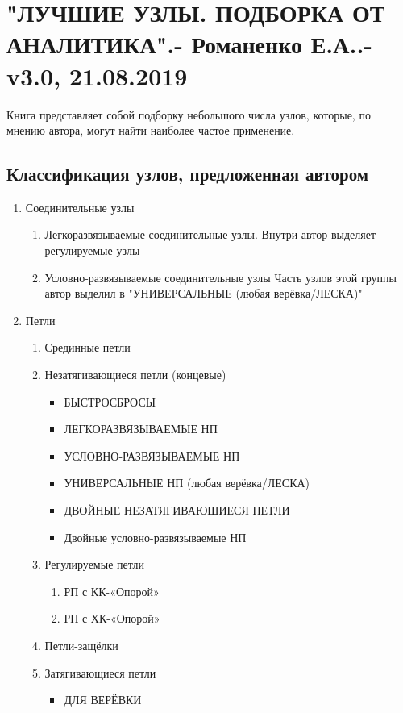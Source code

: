 \section{"ЛУЧШИЕ УЗЛЫ. ПОДБОРКА ОТ АНАЛИТИКА".- Романенко Е.А..- v3.0, 21.08.2019}

Книга представляет собой подборку небольшого числа узлов, которые, по мнению автора, могут найти наиболее частое применение.

\graphicspath{{\currentpath}}

\subsection{Классификация узлов, предложенная автором}

\begin{enumerate}
\item Соединительные узлы
\begin{enumerate}
\item Легкоразвязываемые соединительные узлы.
Внутри автор выделяет регулируемые узлы
\item Условно-развязываемые соединительные узлы
Часть узлов этой группы автор выделил в "УНИВЕРСАЛЬНЫЕ (любая верёвка/ЛЕСКА)"
\end{enumerate}
\item Петли
\begin{enumerate}
\item Срединные петли
\item Незатягивающиеся петли (концевые)
\begin{itemize}
\item БЫСТРОСБРОСЫ
\item ЛЕГКОРАЗВЯЗЫВАЕМЫЕ НП
\item УСЛОВНО-РАЗВЯЗЫВАЕМЫЕ НП
\item УНИВЕРСАЛЬНЫЕ НП (любая верёвка/ЛЕСКА)
\item ДВОЙНЫЕ НЕЗАТЯГИВАЮЩИЕСЯ ПЕТЛИ
\item Двойные условно-развязываемые НП
\end{itemize}
\item Регулируемые петли
\begin{enumerate}
\item РП с КК-«Опорой»
\item РП с ХК-«Опорой»
\end{enumerate}
\item Петли-защёлки
\item Затягивающиеся петли
\begin{itemize}
\item ДЛЯ ВЕРЁВКИ

\end{itemize}
\end{enumerate}
\end{enumerate}

